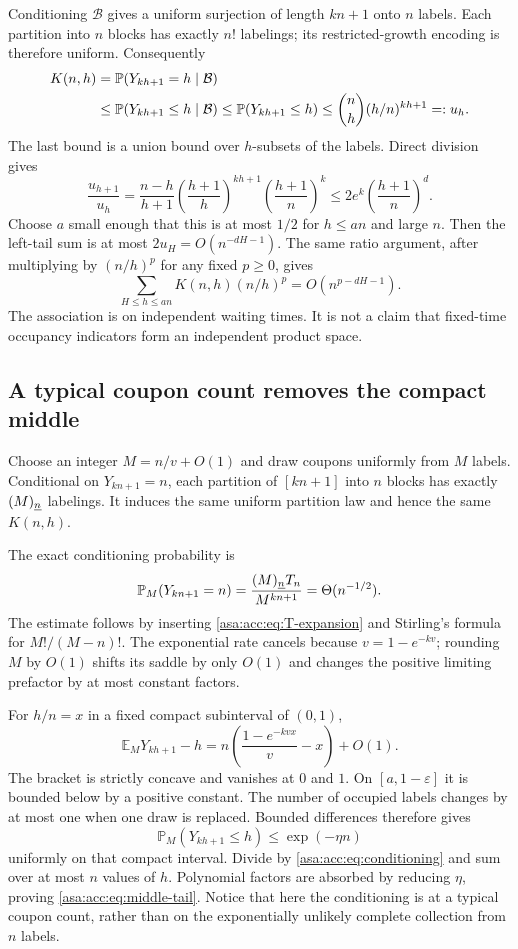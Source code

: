 \documentclass[11pt,letterpaper]{article}
\theoremstyle{remark}\newtheorem{remark}[theorem]{Remark}
\numberwithin{equation}{section}
\newcommand{\E}{\mathbb E}\newcommand{\Prob}{\mathbb P}\newcommand{\Prb}{\mathbb P}
\begin{document}
Conditioning $\mathcal B$ gives a uniform surjection of length $kn+1$ onto $n$ labels. Each partition into $n$ blocks has exactly $n!$ labelings; its restricted-growth encoding is therefore uniform. Consequently
\begin{align}
K(n,h)&=\Prob(Y_{kh+1}=h\mid\mathcal B)\notag\\
&\le\Prob(Y_{kh+1}\le h\mid\mathcal B)
\le\Prob(Y_{kh+1}\le h)
\le \binom nh(h/n)^{kh+1}=:u_h.\label{asa:acc:eq:coupon-left}
\end{align}
The last bound is a union bound over $h$-subsets of the labels. Direct division gives
\[
\frac{u_{h+1}}{u_h}
=\frac{n-h}{h+1}\left(\frac{h+1}{h}\right)^{kh+1}
\left(\frac{h+1}{n}\right)^k
\le 2e^k\left(\frac{h+1}{n}\right)^d.
\]
Choose $a$ small enough that this is at most $1/2$ for $h\le an$ and large $n$. Then the left-tail sum is at most $2u_H=O(n^{-dH-1})$. The same ratio argument, after multiplying by $(n/h)^p$ for any fixed $p\ge0$, gives
\begin{equation}\label{asa:acc:eq:left-weighted}
\sum_{H\le h\le an}K(n,h)(n/h)^p=O(n^{p-dH-1}).
\end{equation}
The association is on independent waiting times. It is not a claim that fixed-time occupancy indicators form an independent product space.

\subsection{A typical coupon count removes the compact middle}
Choose an integer $M=n/v+O(1)$ and draw coupons uniformly from $M$ labels. Conditional on $Y_{kn+1}=n$, each partition of $[kn+1]$ into $n$ blocks has exactly $(M)_{\underline{n}}$ labelings. It induces the same uniform partition law and hence the same $K(n,h)$.

The exact conditioning probability is
\begin{equation}\label{asa:acc:eq:conditioning}
\Prob_M(Y_{kn+1}=n)=\frac{\fall{M}{n}T_n}{M^{kn+1}}=\Theta(n^{-1/2}).
\end{equation}
The estimate follows by inserting \eqref{asa:acc:eq:T-expansion} and Stirling's formula for $M!/(M-n)!$. The exponential rate cancels because $v=1-e^{-kv}$; rounding $M$ by $O(1)$ shifts its saddle by only $O(1)$ and changes the positive limiting prefactor by at most constant factors.

For $h/n=x$ in a fixed compact subinterval of $(0,1)$,
\begin{equation}\label{asa:acc:eq:profile}
\E_M Y_{kh+1}-h
=n\left(\frac{1-e^{-kvx}}v-x\right)+O(1).
\end{equation}
The bracket is strictly concave and vanishes at $0$ and $1$. On $[a,1-\varepsilon]$ it is bounded below by a positive constant. The number of occupied labels changes by at most one when one draw is replaced. Bounded differences therefore gives
\[
\Prob_M(Y_{kh+1}\le h)\le \exp(-\eta n)
\]
uniformly on that compact interval. Divide by \eqref{asa:acc:eq:conditioning} and sum over at most $n$ values of $h$. Polynomial factors are absorbed by reducing $\eta$, proving \eqref{asa:acc:eq:middle-tail}. Notice that here the conditioning is at a typical coupon count, rather than on the exponentially unlikely complete collection from $n$ labels.
\end{document}
